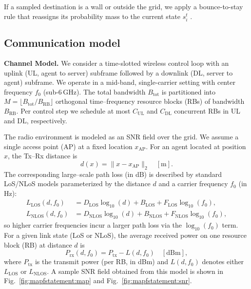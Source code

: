 \documentclass[conference]{IEEEtran}
\begin{document}
If a sampled destination is a wall or outside the grid, we apply a
bounce-to-stay rule that reassigns its probability mass to the
current state $s_i^t$ .



\subsection{Communication model}

\textbf{Channel Model.}
We consider a time-slotted wireless control loop with an uplink (UL, agent to server) subframe followed by a downlink (DL, server to agent) subframe. We operate in a mid-band, single-carrier setting with center frequency $f_0$ (sub-6\,GHz). The total bandwidth $B_{\mathrm{tot}}$ is partitioned into $M=\lfloor B_{\mathrm{tot}}/B_{\mathrm{RB}}\rfloor$ orthogonal time--frequency resource blocks (RBs) of bandwidth $B_{\mathrm{RB}}$. Per control step we schedule at most $C_{\mathrm{UL}}$ and $C_{\mathrm{DL}}$ concurrent RBs in UL and DL, respectively.

The radio environment is modeled as an SNR field over the grid. We assume a
single access point (AP) at a fixed location $x_{\mathrm{AP}}$.
For an agent located at position $x$, the Tx–Rx distance is
\[
  d(x) = \|x - x_{\mathrm{AP}}\|_2 \quad [\mathrm{m}].
\]
The corresponding large–scale path loss (in dB) is described by standard LoS/NLoS
models parameterized by the distance $d$ and a carrier frequency $f_0$ (in Hz):
\begin{align*}
L_{\mathrm{LOS}}(d,f_0) &= D_{\mathrm{LOS}}\log_{10}(d)+B_{\mathrm{LOS}}+F_{\mathrm{LOS}}\log_{10}(f_0),\\
L_{\mathrm{NLOS}}(d,f_0) &= D_{\mathrm{NLOS}}\log_{10}(d)+B_{\mathrm{NLOS}}+F_{\mathrm{NLOS}}\log_{10}(f_0),
\end{align*}
so higher carrier frequencies incur a larger path loss via the
$\log_{10}(f_0)$ term. For a given link state (LoS or NLoS), the average
received power on one resource block (RB) at distance $d$ is
\[
  P_{\mathrm{rx}}(d,f_0) = P_{\mathrm{tx}} - L(d,f_0) \quad [\mathrm{dBm}],
\]
where $P_{\mathrm{tx}}$ is the transmit power (per RB, in dBm) and
$L(d,f_0)$ denotes either $L_{\mathrm{LOS}}$ or $L_{\mathrm{NLOS}}$.
A sample SNR field obtained from this model is shown in
Fig.~\ref{fig:mapfstatement:map} and Fig.~\ref{fig:mapfstatement:snr}.
\end{document}
